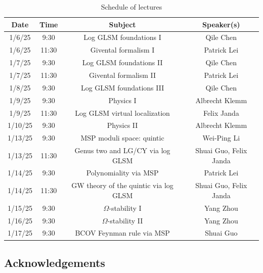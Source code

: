 \documentclass[10pt,oldfontcommands,oneside]{memoir}
\theoremstyle{definition}
\theoremstyle{remark}
\theoremstyle{plain}
\theoremstyle{definition}
\theoremstyle{remark}
\newcommand{\1}{\mathbf{1}}
\newcommand{\2}{\mathbf{2}}
\newcommand{\3}{\mathbf{3}}
\begin{document}
\begin{table}[htpb]
    \centering
    \caption{Schedule of lectures}
    \label{tab:lectures}

    \begin{tabular}{cccc}
        \toprule
        Date & Time & Subject & Speaker(s) \\
        \midrule
        \textsf{1/6/25} & \textsf{9:30} & Log GLSM foundations I & Qile Chen \\
        \textsf{1/6/25} & \textsf{11:30} & Givental formalism I & Patrick Lei \\
        \textsf{1/7/25} & \textsf{9:30} & Log GLSM foundations II & Qile Chen \\
        \textsf{1/7/25} & \textsf{11:30} & Givental formalism II & Patrick Lei \\
        \textsf{1/8/25} & \textsf{9:30} & Log GLSM foundations III & Qile Chen \\
        \textsf{1/9/25} & \textsf{9:30} & Physics I & Albrecht Klemm \\
        \textsf{1/9/25} & \textsf{11:30} & Log GLSM virtual localization & Felix Janda \\
        \textsf{1/10/25} & \textsf{9:30} & Physics II & Albrecht Klemm \\
        \midrule
        \textsf{1/13/25} & \textsf{9:30} & MSP moduli space: quintic & Wei-Ping Li \\
        \textsf{1/13/25} & \textsf{11:30} & Genus two and LG/CY via log GLSM & Shuai Guo, Felix Janda \\
        \textsf{1/14/25} & \textsf{9:30} & Polynomiality via MSP & Patrick Lei \\
        \textsf{1/14/25} & \textsf{11:30} & GW theory of the quintic via log GLSM & Shuai Guo, Felix Janda \\
        \textsf{1/15/25} & \textsf{9:30} & $\Omega$-stability I & Yang Zhou \\
        \textsf{1/16/25} & \textsf{9:30} & $\Omega$-stability II & Yang Zhou \\
        \textsf{1/17/25} & \textsf{9:30} & BCOV Feynman rule via MSP & Shuai Guo \\
        \bottomrule
    \end{tabular}
\end{table}

\subsection*{Acknowledgements}%
\label{sub:Acknowledgements}
\end{document}
